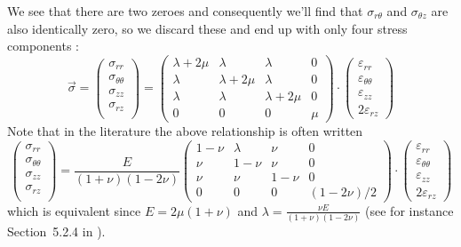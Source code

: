 We see that there are two zeroes and consequently we'll find that
$\sigma_{r\theta}$ and $\sigma_{\theta z}$ are also
identically zero, so we discard these and end up with only four stress components :
\[
\vec{\sigma}=
\left(
\begin{array}{c}
\sigma_{rr} \\
\sigma_{\theta\theta} \\
\sigma_{zz} \\
\sigma_{rz} \\
\end{array}
\right)
=
\left(
\begin{array}{cccc}
\lambda+2\mu & \lambda & \lambda & 0  \\
\lambda & \lambda+2\mu & \lambda & 0  \\
\lambda & \lambda & \lambda+2\mu & 0  \\
0 & 0 & 0 & \mu 
\end{array}
\right)
\cdot
\left(
\begin{array}{c}
\varepsilon_{rr} \\
\varepsilon_{\theta\theta} \\
\varepsilon_{zz} \\
2\varepsilon_{rz} 
\end{array}
\right)
\]
Note that in the literature the above relationship is often written 
\[
\left(
\begin{array}{c}
\sigma_{rr} \\
\sigma_{\theta\theta} \\
\sigma_{zz} \\
\sigma_{rz} \\
\end{array}
\right)
=
\frac{E}{(1+\nu)(1-2\nu)}
\left(
\begin{array}{cccc}
1-\nu & \lambda & \nu & 0  \\
\nu & 1-\nu & \nu & 0  \\
\nu & \nu & 1-\nu & 0  \\
0 & 0 & 0 & (1-2\nu)/2
\end{array}
\right)
\cdot
\left(
\begin{array}{c}
\varepsilon_{rr} \\
\varepsilon_{\theta\theta} \\
\varepsilon_{zz} \\
2\varepsilon_{rz} 
\end{array}
\right)
\]
which is equivalent since $E=2\mu(1+\nu)$ and $\lambda=\frac{\nu E}{(1+\nu)(1-2\nu)}$ (see for instance Section~5.2.4 in \cite{zita1}).   

